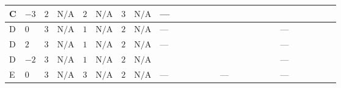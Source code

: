 \documentclass[8pt]{article}
\begin{document}
\begin{landscape}
\begin{longtable}{@{}llcccccc >{\raggedright\arraybackslash}p{0.21\linewidth} >{\raggedright\arraybackslash}p{0.21\linewidth} >{\raggedright\arraybackslash}p{0.21\linewidth}@{}}
\midrule
C & $-3$ & $2$ & $\text{N/A}$ & $2$ & $\text{N/A}$ & $3$ & $\text{N/A}$ & --- & \scriptsize\adjustbox{max width=\linewidth}{$\begin{gathered} {\lambda_{HS_2}^{(1)}} (6 \operatorname{Tr}\!\left({Y_d}\,\left({Y_d}\right)^{\dagger}\right)+2 \operatorname{Tr}\!\left({Y_e}\,\left({Y_e}\right)^{\dagger}\right)+6 \operatorname{Tr}\!\left({Y_u}\,\left({Y_u}\right)^{\dagger}\right))\end{gathered}$} & \scriptsize\adjustbox{max width=\linewidth}{$\begin{gathered} +\frac{9 {g_2}^4}{4}\end{gathered}$} \\
\midrule
D & $0$ & $3$ & $\text{N/A}$ & $1$ & $\text{N/A}$ & $2$ & $\text{N/A}$ & --- & \scriptsize\adjustbox{max width=\linewidth}{$\begin{gathered} {\lambda_{HS_2}^{(1)}} (6 \operatorname{Tr}\!\left({Y_d}\,\left({Y_d}\right)^{\dagger}\right)+2 \operatorname{Tr}\!\left({Y_e}\,\left({Y_e}\right)^{\dagger}\right)+6 \operatorname{Tr}\!\left({Y_u}\,\left({Y_u}\right)^{\dagger}\right))\end{gathered}$} & --- \\
\midrule
D & $2$ & $3$ & $\text{N/A}$ & $1$ & $\text{N/A}$ & $2$ & $\text{N/A}$ & --- & \scriptsize\adjustbox{max width=\linewidth}{$\begin{gathered} {\lambda_{HS_2}^{(1)}} (6 \operatorname{Tr}\!\left({Y_d}\,\left({Y_d}\right)^{\dagger}\right)+2 \operatorname{Tr}\!\left({Y_e}\,\left({Y_e}\right)^{\dagger}\right)+6 \operatorname{Tr}\!\left({Y_u}\,\left({Y_u}\right)^{\dagger}\right))\end{gathered}$} & --- \\
\midrule
D & $-2$ & $3$ & $\text{N/A}$ & $1$ & $\text{N/A}$ & $2$ & $\text{N/A}$ & \scriptsize\adjustbox{max width=\linewidth}{$\begin{gathered} +4 {\lambda_{X_{16}}} (3 \left({\lambda_{X_{2}}}\right)^{*}+4 \left({\lambda_{X_{16}}}\right)^{*})\end{gathered}$} & \scriptsize\adjustbox{max width=\linewidth}{$\begin{gathered} {\lambda_{HS_2}^{(1)}} (6 \operatorname{Tr}\!\left({Y_d}\,\left({Y_d}\right)^{\dagger}\right)+2 \operatorname{Tr}\!\left({Y_e}\,\left({Y_e}\right)^{\dagger}\right)+6 \operatorname{Tr}\!\left({Y_u}\,\left({Y_u}\right)^{\dagger}\right))\end{gathered}$} & --- \\
\midrule
E & $0$ & $3$ & $\text{N/A}$ & $3$ & $\text{N/A}$ & $2$ & $\text{N/A}$ & --- & --- & --- \\

\end{longtable}
\end{landscape}
\end{document}
